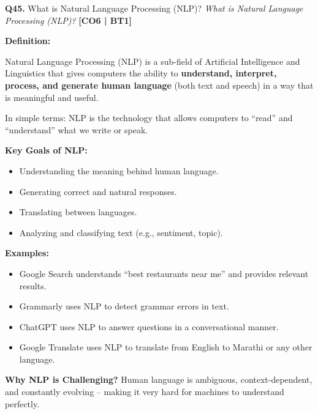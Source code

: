 \documentclass[12pt,a4paper]{article}
\newcommand{\Qno}[1]{\textbf{\color{darkred}Q#1.}}
\begin{document}
\vspace{8pt}

\begin{questionbox}{\Qno{45} What is Natural Language Processing (NLP)?}
\textit{What is Natural Language Processing (NLP)?} \hfill \textbf{[CO6 | BT1]}
\end{questionbox}

\begin{answerenv}

\textbf{\color{headingcolor}Definition:}

Natural Language Processing (NLP) is a sub-field of Artificial Intelligence and Linguistics that gives computers the ability to \textbf{understand, interpret, process, and generate human language} (both text and speech) in a way that is meaningful and useful.

\vspace{6pt}
In simple terms: NLP is the technology that allows computers to ``read'' and ``understand'' what we write or speak.

\vspace{6pt}
\textbf{\color{headingcolor}Key Goals of NLP:}
\begin{itemize}[leftmargin=1.5em, itemsep=2pt]
  \item Understanding the meaning behind human language.
  \item Generating correct and natural responses.
  \item Translating between languages.
  \item Analyzing and classifying text (e.g., sentiment, topic).
\end{itemize}

\textbf{\color{headingcolor}Examples:}
\begin{itemize}[leftmargin=1.5em, itemsep=2pt]
  \item Google Search understands ``best restaurants near me'' and provides relevant results.
  \item Grammarly uses NLP to detect grammar errors in text.
  \item ChatGPT uses NLP to answer questions in a conversational manner.
  \item Google Translate uses NLP to translate from English to Marathi or any other language.
\end{itemize}

\begin{keypoint}
\textbf{Why NLP is Challenging?} Human language is ambiguous, context-dependent, and constantly evolving -- making it very hard for machines to understand perfectly.
\end{keypoint}

\end{answerenv}
\end{document}
